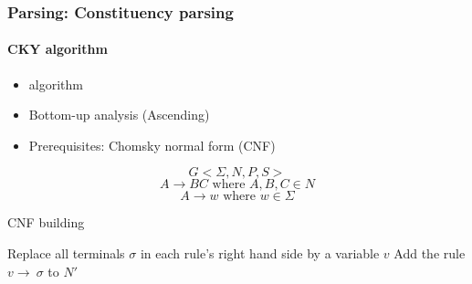 \documentclass[xcolor=table]{beamer}
\begin{document}
\begin{frame}
\frametitle{Parsing: Constituency parsing}
\framesubtitle{CKY algorithm}

\begin{itemize}
	\item {} algorithm
	\item Bottom-up analysis (Ascending)
	\item Prerequisites: Chomsky normal form (CNF)
\end{itemize}

\begin{minipage}{.4\textwidth}
	\begin{definition}[CNF]
		\[G <\Sigma, N, P, S>\]
		\[A \rightarrow  B C \text{ where } A, B, C \in N\]
		\[A \rightarrow w \text{ where } w \in \Sigma\]
	\end{definition}
\end{minipage}
\begin{minipage}{.56\textwidth}
	\begin{block}{CNF building}
	\tiny
	\begin{algorithm}[H]
		
		Replace all terminals $\sigma$ in each rule's right hand side by a variable $v$\;
		Add the rule $v \rightarrow\ \sigma$ to $N'$\;
	\end{algorithm}
	\end{block}
\end{minipage}

\end{frame}
\end{document}
